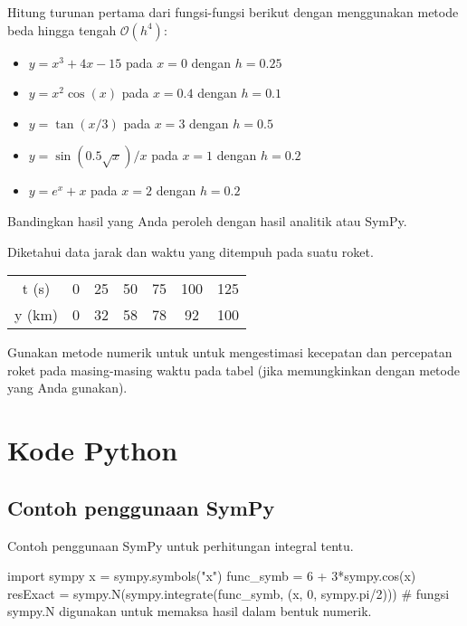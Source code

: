 \begin{soal}
Hitung turunan pertama dari fungsi-fungsi berikut dengan menggunakan metode beda hingga
tengah $\mathcal{O}(h^4)$:
\begin{itemize}
\item $y = x^3 + 4x - 15$ pada $x=0$ dengan $h=0.25$
\item $y = x^2 \cos(x)$ pada $x=0.4$ dengan $h=0.1$
\item $y = \tan(x/3)$ pada $x=3$ dengan $h=0.5$
\item $y = \sin(0.5\sqrt{x})/x$ pada $x=1$ dengan $h=0.2$
\item $y = e^{x} + x$ pada $x=2$ dengan $h=0.2$
\end{itemize}
Bandingkan hasil yang Anda peroleh dengan hasil analitik atau SymPy.
\end{soal}


\begin{soal}
Diketahui data jarak dan waktu yang ditempuh pada suatu roket.

{\centering
\begin{tabular}{|c|cccccc|}
\hline
t (s)  & 0 & 25 & 50 & 75 & 100 & 125 \\
y (km) & 0 & 32 & 58 & 78 &  92 & 100 \\
\hline
\end{tabular}
\par}

Gunakan metode numerik untuk untuk mengestimasi kecepatan dan percepatan roket
pada masing-masing waktu pada tabel (jika memungkinkan dengan metode yang Anda
gunakan).
\end{soal}


\section*{Kode Python}

\subsection*{Contoh penggunaan SymPy}
Contoh penggunaan SymPy untuk perhitungan integral tentu.
\begin{fullwidth}
\begin{pythoncode}
import sympy
x = sympy.symbols("x")
func_symb = 6 + 3*sympy.cos(x)
resExact = sympy.N(sympy.integrate(func_symb, (x, 0, sympy.pi/2)))
# fungsi sympy.N digunakan untuk memaksa hasil dalam bentuk numerik.
\end{pythoncode}
\end{fullwidth}

